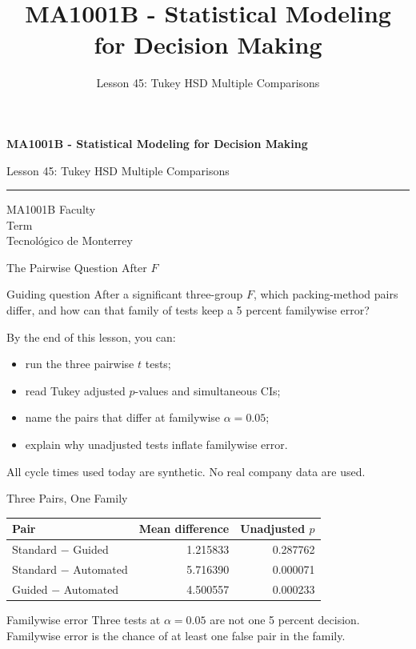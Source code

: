 \documentclass[aspectratio=169,10pt,english]{beamer}
\title{MA1001B - Statistical Modeling for Decision Making}
\subtitle{Lesson 45: Tukey HSD Multiple Comparisons}
\author{}
\institute{Tecnol\'ogico de Monterrey}
\date{}
\begin{document}
\begin{frame}[plain]
  \vspace{1.2cm}
  {\Large\bfseries MA1001B - Statistical Modeling for Decision Making\par}
  \vspace{0.7cm}
  {\large Lesson 45: Tukey HSD Multiple Comparisons\par}
  \vspace{0.7cm}
  {\color{TecRojo}\rule{\textwidth}{1.2pt}}
  \vspace{0.8cm}

  MA1001B Faculty\\[0.3cm]
  Term\\[0.3cm]
  Tecnol\'ogico de Monterrey
\end{frame}

\begin{frame}{The Pairwise Question After $F$}
  \begin{alertblock}{Guiding question}
    After a significant three-group $F$, which packing-method pairs differ,
    and how can that family of tests keep a 5 percent familywise error?
  \end{alertblock}

  \vspace{0.6em}
  By the end of this lesson, you can:
  \begin{itemize}
    \item run the three pairwise $t$ tests;
    \item read Tukey adjusted $p$-values and simultaneous CIs;
    \item name the pairs that differ at familywise $\alpha=0.05$;
    \item explain why unadjusted tests inflate familywise error.
  \end{itemize}

  \vfill
  \scriptsize All cycle times used today are synthetic. No real company data are used.
\end{frame}

\begin{frame}{Three Pairs, One Family}
  \small
  \begin{center}
    \begin{tabular}{lrr}
      \toprule
      \textbf{Pair} & \textbf{Mean difference} & \textbf{Unadjusted $p$} \\
      \midrule
      Standard $-$ Guided & 1.215833 & 0.287762 \\
      Standard $-$ Automated & 5.716390 & 0.000071 \\
      Guided $-$ Automated & 4.500557 & 0.000233 \\
      \bottomrule
    \end{tabular}
  \end{center}

  \vspace{0.5em}
  \begin{exampleblock}{Familywise error}
    Three tests at $\alpha=0.05$ are not one 5 percent decision. Familywise
    error is the chance of at least one false pair in the family.
  \end{exampleblock}
\end{frame}
\end{document}
